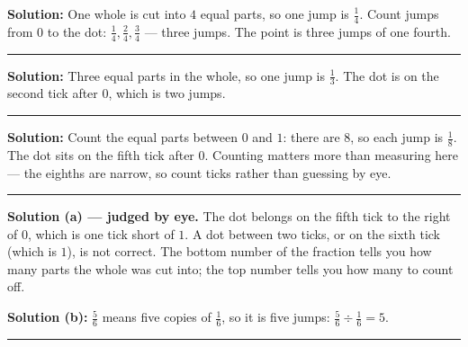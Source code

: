 \documentclass[12pt]{article}
\begin{document}



\textbf{Solution:} One whole is cut into $4$ equal parts, so one jump is $\frac{1}{4}$. Count jumps
from $0$ to the dot: $\frac{1}{4}, \frac{2}{4}, \frac{3}{4}$ --- three jumps. The point is three
jumps of one fourth. 

\vspace{0.15cm}\noindent\rule{\linewidth}{0.2pt}


\textbf{Solution:} Three equal parts in the whole, so one jump is $\frac{1}{3}$. The dot is on the
second tick after $0$, which is two jumps. 

\vspace{0.15cm}\noindent\rule{\linewidth}{0.2pt}


\textbf{Solution:} Count the equal parts between $0$ and $1$: there are $8$, so each jump is
$\frac{1}{8}$. The dot sits on the fifth tick after $0$. Counting matters more than measuring here ---
the eighths are narrow, so count ticks rather than guessing by eye. 

\vspace{0.15cm}\noindent\rule{\linewidth}{0.2pt}


\textbf{Solution (a) --- judged by eye.} The dot belongs on the fifth tick to the right of $0$, which
is one tick short of $1$. A dot between two ticks, or on the sixth tick (which is $1$), is not
correct. The bottom number of the fraction tells you how many parts the whole was cut into; the top
number tells you how many to count off.

\textbf{Solution (b):} $\frac{5}{6}$ means five copies of $\frac{1}{6}$, so it is five jumps:
$\frac{5}{6} \div \frac{1}{6} = 5$. 

\vspace{0.15cm}\noindent\rule{\linewidth}{0.2pt}

\end{document}
